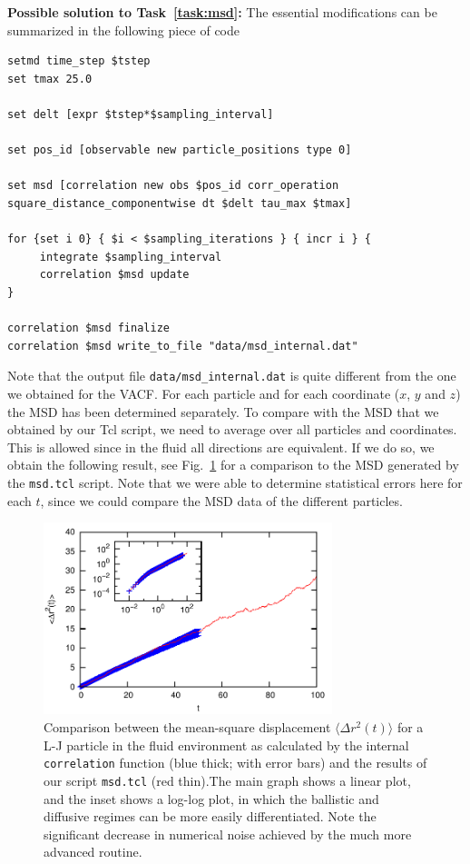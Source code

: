 \documentclass[
paper=a4,                       %
fontsize=11pt,                  %
twoside,                        %
footsepline,                    %
headsepline,                    %
headinclude=false,              %
footinclude=false,              %
pagesize,                       %
]{scrartcl}
\begin{document}
\textbf{Possible solution to Task~\ref{task:msd}:} The essential modifications can be summarized in the following piece of code

{\small\vspace{0,2cm}
\begin{lstlisting}[numbers=none]
setmd time_step $tstep
set tmax 25.0

set delt [expr $tstep*$sampling_interval]

set pos_id [observable new particle_positions type 0]

set msd [correlation new obs $pos_id corr_operation square_distance_componentwise dt $delt tau_max $tmax]

for {set i 0} { $i < $sampling_iterations } { incr i } {
     integrate $sampling_interval
     correlation $msd update
}

correlation $msd finalize
correlation $msd write_to_file "data/msd_internal.dat"
\end{lstlisting}\vspace{0,2cm}
}

Note that the output file \texttt{data/msd\_internal.dat} is quite different from the one we obtained for the VACF. For each particle and for each coordinate ($x$, $y$ and $z$) the MSD has been determined separately. To compare with the MSD that we obtained by our Tcl script, we need to average over all particles and coordinates. This is allowed since in the fluid all directions are equivalent. If we do so, we obtain the following result, see Fig.~\ref{fig:msd_internal} for a comparison to the MSD generated by the \texttt{msd.tcl} script. Note that we were able to determine statistical errors here for each $t$, since we could compare the MSD data of the different particles.

\begin{figure}[!ht]
\begin{center}
\includegraphics[width=0.75\textwidth]{figures/msd_internal}
\caption{\label{fig:msd_internal} Comparison between the mean-square displacement $\langle \Delta r^2(t) \rangle$ for a L-J particle in the fluid environment as calculated by the internal \es{} \lstinline|correlation| function (blue thick; with error bars) and the results of our script \texttt{msd.tcl} (red thin).The main graph shows a linear plot, and the inset shows a log-log plot, in which the ballistic and diffusive regimes can be more easily differentiated. Note the significant decrease in numerical noise achieved by the much more advanced \es{} routine.}
\end{center}
\end{figure}
\end{document}
